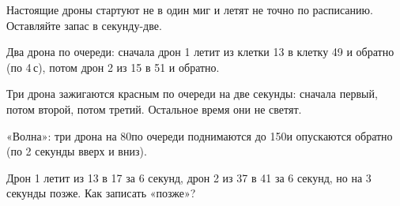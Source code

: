 \begin{vnimanie}
Настоящие дроны стартуют не в один миг и летят не точно по расписанию. Оставляйте запас в секунду-две.
\end{vnimanie}

\begin{probuy}
  \item Два дрона по очереди: сначала дрон 1 летит из клетки 13 в клетку 49 и обратно (по 4\,с), потом дрон 2 из 15 в 51 и обратно.
  \item Три дрона зажигаются красным по очереди на две секунды: сначала первый, потом второй, потом третий. Остальное время они не светят.
  \item «Волна»: три дрона на 80\cm по очереди поднимаются до 150\cm и опускаются обратно (по 2 секунды вверх и вниз).
  \item Дрон 1 летит из 13 в 17 за 6 секунд, дрон 2 из 37 в 41 за 6 секунд, но на 3 секунды позже. Как записать «позже»?
\end{probuy}
